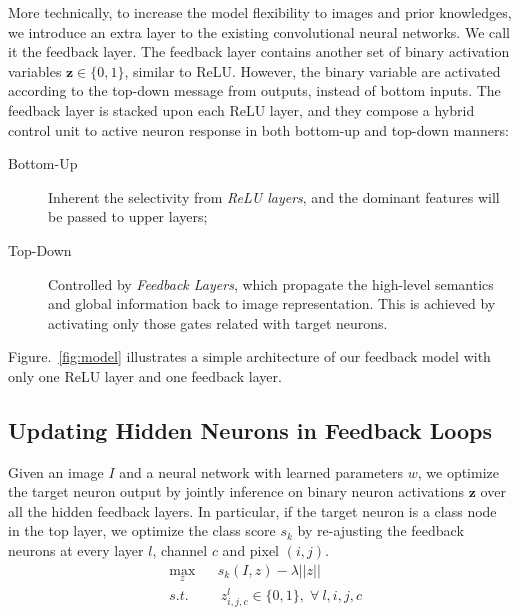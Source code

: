 More technically, to increase the model flexibility to images and prior knowledges, we introduce an extra layer to the existing convolutional neural networks. We call it the feedback layer. The feedback layer contains another set of binary activation variables $\mathbf{z} \in \{0, 1\}$, similar to ReLU. However, the binary variable are activated according to the top-down message from outputs, instead of bottom inputs.
%
The feedback layer is stacked upon each ReLU layer, and they compose a hybrid control unit to active neuron response in both bottom-up and top-down manners:
\begin{description}
  \item[Bottom-Up] Inherent the selectivity from \emph{ReLU layers}, and the dominant features will be passed to upper layers;
  \item[Top-Down] Controlled by \emph{Feedback Layers}, which propagate the high-level semantics and global information back to image representation. This is achieved by activating only those gates related with target neurons.
\end{description}
%
Figure.~\ref{fig:model} illustrates a simple architecture of our feedback model with only one ReLU layer and one feedback layer.

\subsection{Updating Hidden Neurons in Feedback Loops}
Given an image $I$ and a neural network with learned parameters $w$, we optimize the target neuron output by jointly inference on binary neuron activations $\mathbf{z}$ over all the hidden feedback layers. In particular, if the target neuron is a class node in the top layer, we optimize the class score $s_k$ by re-ajusting the feedback neurons at every layer $l$, channel $c$ and pixel $(i,j)$.
\begin{equation}
\begin{aligned}
& \max_z & & s_k(I, z) - \lambda ||z|| \\
& s.t. & & \ z^l_{i,j,c} \in \{0, 1\}, \; \forall\ l, i, j, c
\end{aligned}
\end{equation}

